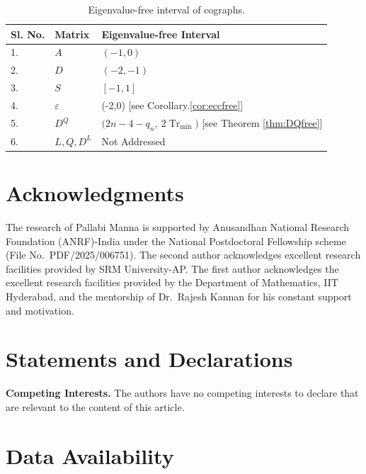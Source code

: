 \documentclass[11pt]{article}
\theoremstyle{plain}
\theoremstyle{definition}
\theoremstyle{remark}
\DeclareMathOperator{\Tr}{Tr}
\begin{document}
	\begin{table}[h]
		\centering
		\begin{tabular}{lll}
			\toprule
			Sl. No. & Matrix & Eigenvalue-free Interval \\
			\midrule
			1. & $A$ & $(-1,0)$  \cite{MohammadianTrevisan2016} \\
			2. & $D$ & $(-2,-1)$ \cite{LouLin2020}\\
			3. & $S$ & $[-1,1]$ \cite{LiWangBrunetti2024,NiuWang2024}\\
			4. & $\varepsilon$ & (-2,0) [see Corollary.\ref{cor:eccfree}] \\
			5. &$D^Q$ & $\bigl(2n-4-q_n,\ 2\Tr_{\min}\bigr)$ [see Theorem \ref{thm:DQfree}] \\
			6. & $L,Q,D^L$&Not Addressed  \\
			
			\bottomrule
		\end{tabular}
		\caption{Eigenvalue-free interval of cographs.}
		\label{tab:cographeigenvaluefreeinterval}
	\end{table}
	
	
	
	
	
	
	
	\section*{Acknowledgments}
	
	The research of Pallabi Manna is supported by Anusandhan National Research Foundation
	(ANRF)-India under the National Postdoctoral Fellowship scheme (File No.\ PDF/2025/006751). The
	second author acknowledges excellent research facilities provided by SRM University-AP. The first
	author acknowledges the excellent research facilities provided by the Department of Mathematics,
	IIT Hyderabad, and the mentorship of Dr.\ Rajesh Kannan for his constant support and motivation.
	
	\section*{Statements and Declarations}
	
	\noindent\textbf{Competing Interests.} The authors have no competing interests to declare that are
	relevant to the content of this article.
	
	\section*{Data Availability}
	
\end{document}
